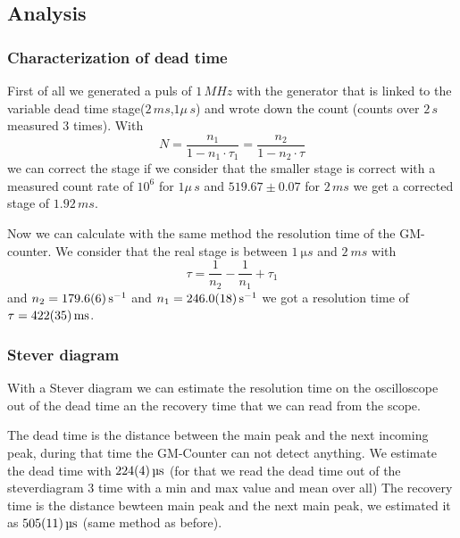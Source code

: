 \subsection{Analysis}

\subsubsection{Characterization of dead time}

First of all we generated a puls of $1\,MHz$ with the generator
that is linked to the variable dead time stage($2\,ms$,$1\mu\,s$) and wrote down the count (counts over $2\,s$ measured $3$ times).
With
\begin{equation}
N =\frac{n_1}{1-n_1\cdot\tau_1}=\frac{n_2}{1-n_2\cdot\tau}
\end{equation}
we can correct the stage if we consider that the smaller stage is correct 
with a measured count rate of $10^6$ for $1\mu\,s$ and 
$519.67\pm0.07$ for $2\,ms$ we get a corrected stage of $1.92\,ms$.

Now we can calculate with the same method the resolution time of the GM-counter.
We consider that the real stage is between $\SI{1}{\micro s}$ and $\SI{2}{ms}$ with
\begin{equation}
\tau =\frac{1}{n_2}-\frac{1}{n_1}+\tau_1
\end{equation}
and $n_2=\SI{179.6\pm0.6}{s^{-1}}$ and $n_1=\SI{246.0\pm1.8}{s^{-1}}$ we got a resolution time of $\tau=\SI{422\pm35}{ms}$.

\subsubsection{Stever diagram}


With a Stever diagram we can estimate the resolution time on the oscilloscope out of the dead time an the recovery time that we can read from the scope. 

The dead time is the distance between the main peak and the next incoming peak, during that time the GM-Counter can not detect anything.
We estimate the dead time with $\SI{224 \pm 4}{\micro s}$ (for that we read the dead time out of the steverdiagram 3 time with a min and max value and mean over all)
The recovery time is the distance bewteen main peak and the next main peak, we estimated it as $\SI{505\pm11}{\micro s}$ (same method as before).

